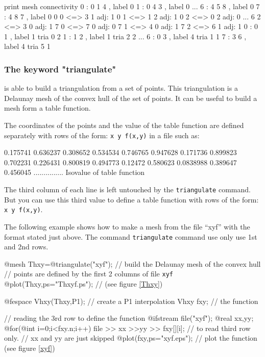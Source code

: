 \documentclass[a4paper,twoside,12pt]{book}
\begin{document}
 print mesh connectivity
0 :  0 1 4 , label  0
1 :  0 4 3 , label  0
...
6 :  4 5 8 , label  0
7 :  4 8 7 , label  0
0 0 <=>  3 1  adj: 1
0 1 <=>  1 2  adj: 1
0 2 <=>  0 2  adj: 0
...
6 2 <=>  3 0  adj: 1
7 0 <=>  7 0  adj: 0
7 1 <=>  4 0  adj: 1
7 2 <=>  6 1  adj: 1
0 : 0 1 , label 1 tria  0 2
1 : 1 2 , label 1 tria  2 2
...
6 : 0 3 , label 4 tria  1 1
7 : 3 6 , label 4 tria  5 1

\eFF


\subsubsection{The keyword "triangulate"}

\freefempp is able to build a triangulation from a set of points. This
triangulation is a Delaunay mesh of the convex hull of the set of points.
It can be useful to build a mesh form a table function.

The coordinates of the points and the value of the table function
are defined separately with rows of the form: \texttt{x y f(x,y)}
in a file such as:

 0.175741 0.636237
0.308652 0.534534 0.746765
0.947628 0.171736 0.899823
0.702231 0.226431 0.800819
0.494773 0.12472 0.580623
0.0838988 0.389647 0.456045
...............
\eFF
{Isovalue of table function}

The third column of each line is left untouched by the
\texttt{triangulate} command. But you can use this third value to
define a table function with rows of the form: \texttt{x y f(x,y)}.


The following example shows how to make a mesh from the file ``xyf''
with the format stated just above.
The command
\texttt{triangulate} command use only use 1st and 2nd rows.


\bFF
@mesh Thxy=@triangulate("xyf"); // build the Delaunay mesh of the convex hull
// points are defined by the first 2 columns of file \texttt{xyf}
@plot(Thxy,ps="Thxyf.ps"); // (see figure  \ref{Thxy})

@fespace Vhxy(Thxy,P1); // create a P1 interpolation
Vhxy fxy; // the function

// reading the 3rd row to define the function
{ @ifstream file("xyf");
   @real xx,yy;
   @for(@int i=0;i<fxy.n;i++)
   file >> xx >>yy >> fxy[][i];  // to read third row only.
   // xx and yy are just skipped
}
@plot(fxy,ps="xyf.eps"); // plot the function (see figure  \ref{xyf})
\eFF
\end{document}

